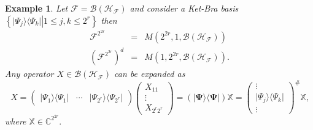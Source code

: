 \documentclass[aps, preprint]{revtex4}
\newtheorem{example}[theorem]{Example}
\begin{document}
\begin{example}
Let $\mathcal{F} =\mathcal{B} \left (\mathcal{H}_{\mathcal{F}}\right )$ and consider a Ket-Bra basis $\left \{\left .\vert \Psi _{j} \rangle  \langle \Psi _{k}\vert \right \vert 1 \leq j ,k \leq 2^{r}\right \}$ then
\begin{align}\mathcal{F}^{2^{2 r}} &  = & M \left (2^{2 r} ,1 ,\mathcal{B} \left (\mathcal{H}_{\mathcal{F}}\right )\right ) \\
\left (\mathcal{F}^{2^{2 r}}\right )^{d} &  = & M \left (1 ,2^{2 r} ,\mathcal{B} \left (\mathcal{H}_{\mathcal{F}}\right )\right )\text{.}\end{align}Any operator $X \in \mathcal{B} \left (\mathcal{H}_{\mathcal{F}}\right )$ can be expanded as
\begin{equation}X =\left (\begin{array}{ccc}\vert \Psi _{1} \rangle  \langle \Psi _{1}\vert  & \cdots  & \vert \Psi _{2^{r}} \rangle  \langle \Psi _{2^{r}}\vert \end{array}\right ) \left (\begin{array}{c}X_{1 1} \\
\vdots  \\
X_{2^{r} 2^{r}}\end{array}\right ) =\left (\vert \mathbf{\Psi } \rangle  \langle \mathbf{\Psi }\vert \right ) \mathbb{X} =\left (\begin{array}{c}\vdots  \\
\vert \Psi _{j} \rangle  \langle \Psi _{k}\vert  \\
\vdots \end{array}\right )^{\#} \mathbb{X}\text{,}
\end{equation}where $\mathbb{X} \in \mathbb{C}^{2^{2 r}}\text{.}$ 
\end{example}
\end{document}
